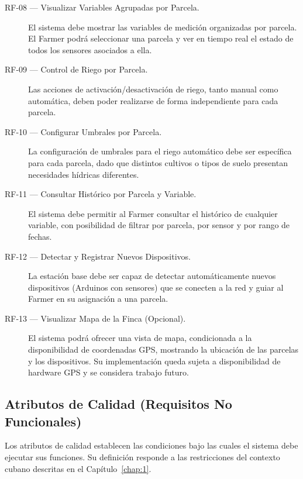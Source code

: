 \begin{description}
	\item[RF-08 — Visualizar Variables Agrupadas por Parcela.]
	El sistema debe mostrar las variables de medición organizadas por parcela. El Farmer
	podrá seleccionar una parcela y ver en tiempo real el estado de todos los sensores
	asociados a ella.
	
	\item[RF-09 — Control de Riego por Parcela.]
	Las acciones de activación/desactivación de riego, tanto manual como automática, deben
	poder realizarse de forma independiente para cada parcela.
	
	\item[RF-10 — Configurar Umbrales por Parcela.]
	La configuración de umbrales para el riego automático debe ser específica para cada
	parcela, dado que distintos cultivos o tipos de suelo presentan necesidades hídricas
	diferentes.
	
	\item[RF-11 — Consultar Histórico por Parcela y Variable.]
	El sistema debe permitir al Farmer consultar el histórico de cualquier variable, con
	posibilidad de filtrar por parcela, por sensor y por rango de fechas.
	
	\item[RF-12 — Detectar y Registrar Nuevos Dispositivos.]
	La estación base debe ser capaz de detectar automáticamente nuevos dispositivos
	(Arduinos con sensores) que se conecten a la red y guiar al Farmer en su asignación
	a una parcela.
	
	\item[RF-13 — Visualizar Mapa de la Finca \textnormal{(Opcional)}.]
	El sistema podrá ofrecer una vista de mapa, condicionada a la disponibilidad de
	coordenadas GPS, mostrando la ubicación de las parcelas y los dispositivos. Su
	implementación queda sujeta a disponibilidad de hardware GPS y se considera trabajo
	futuro.
	
\end{description}

\subsection{Atributos de Calidad (Requisitos No Funcionales)}

Los atributos de calidad establecen las condiciones bajo las cuales el sistema debe ejecutar
sus funciones. Su definición responde a las restricciones del contexto cubano descritas en
el Capítulo~\ref{chap:1}.

